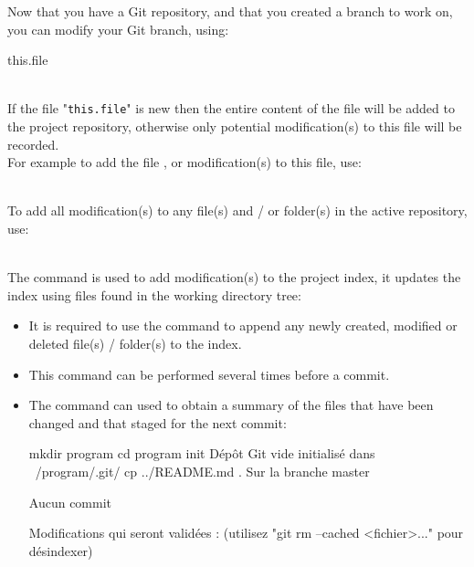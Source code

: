 Now that you have a Git repository, and that you created a branch to work on, you can modify your Git branch, using:
\begin{script}
   this.file
\end{script}
\\[-0.25cm]
If the file "\texttt{this.file}" is new then the entire content of the file will be added to the project repository, 
otherwise only potential modification(s) to this file will be recorded. \\[0.25cm]
For example to add the file , or modification(s) to this file, use: 
\begin{script}
   
\end{script}
\\[-0.25cm]
\noindent To add all modification(s) to any file(s) and / or folder(s) in the active repository, use:
\begin{script}
   
\end{script}
\\[-0.5cm]
\noindent The   command is used to add modification(s) to the project index, it updates the index using files 
found in the working directory tree: 
\begin{itemize}
\item It is required to use the  command to append any newly created, modified or deleted file(s) / folder(s) to the index. 
\item This command can be performed several times before a commit. 
\item The   command can used to obtain a summary of the files that have been changed and that staged for the next commit:
{\scriptsize{
\begin{scripti}
\fprompt{~} mkdir program
\fprompt{~} cd program
  init
Dépôt Git vide initialisé dans ~/program/.git/
 cp ../README.md .
   
  
Sur la branche master

Aucun commit

Modifications qui seront validées :
  (utilisez "git rm --cached <fichier>..." pour désindexer)
\end{scripti}
}}
\end{itemize}
